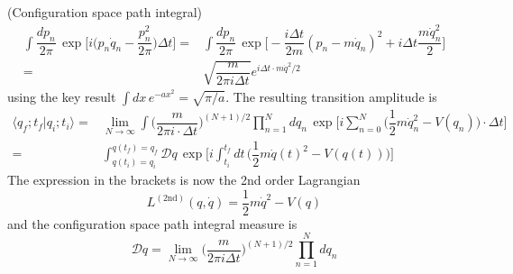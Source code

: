 \vspace{2ex}
\begin{thm}
(Configuration space path integral) 
\[\begin{align*}
\int \dfrac{dp_{n}}{2\pi }\,\exp \Big[i\Big(p_{n}\dot{q}_{n}-\dfrac{p_{n}^2}{2\pi }\Big)\Delta t\Big]=&\int \dfrac{dp_{n}}{2\pi }\,\exp \Big[-\dfrac{i\Delta t}{2m}(p_{n}-m\dot{q}_{n})^2+i\Delta t\dfrac{m\dot{q}_{n}^2}{2}\Big]\\
=&\sqrt{\dfrac{m}{2\pi i\Delta t}}e^{i\Delta t\cdot m\dot{q}^2/2}
\end{align*}\]
using the key result $\int dx\,e^{-ax^2}=\sqrt{\pi /a}$. The resulting transition amplitude is 
\[\begin{align*}
\langle q_{f};t_{f}|q_{i};t_{i}\rangle =&\lim _{N\rightarrow \infty }\int \Big(\dfrac{m}{2\pi i\cdot \Delta t}\Big)^{(N+1)/2}\prod^{N}_{n=1}dq_{n}\,\exp \Big[i\sum ^{N}_{n=0}\Big(\dfrac{1}{2}m\dot{q}_{n}^2-V(q_{n})\Big)\cdot \Delta t\Big]\\
=&\int ^{q(t_{f})=q_{f}}_{q(t_{i})=q_{i}}\mathcal{D}q\,\exp \Big[i\int ^{t_{f}}_{t_{i}}dt\,\Big(\dfrac{1}{2}m\dot{q}(t)^2-V(q(t))\Big)\Big]
\end{align*}\]
The expression in the brackets is now the 2nd order Lagrangian
\[L^{(2\mathrm{nd})}(q,\dot{q})=\dfrac{1}{2}m\dot{q}^2-V(q)\]
and the configuration space path integral measure is
\[\mathcal{D}q=\lim _{N\rightarrow \infty }\Big(\dfrac{m}{2\pi i\Delta t}\Big)^{(N+1)/2}\prod^{N}_{n=1}dq_{n}\]
\end{thm}
\vspace{2ex}

